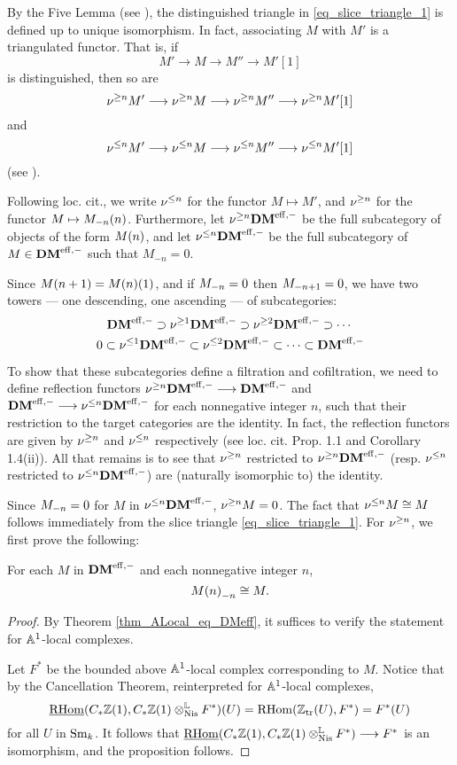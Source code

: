 By the Five Lemma (see \cite[10.2.2]{WH}), the distinguished 
triangle in \eqref{eq_slice_triangle_1} is defined up to unique 
isomorphism. In fact, associating $M$ with $M'$ is a triangulated 
functor. That is, if
\[
M' \to M \to M'' \to M'[1]
\]
is distinguished, then so are
\[
\sgDM{n}M' \to \sgDM{n}M \to \sgDM{n}M'' \to \sgDM{n}M'[1]
\]
and
\[
\slDM{n}M' \to \slDM{n}M \to \slDM{n}M'' \to \slDM{n}M'[1]
\]
(see \cite[Corollary 1.4]{HuKa}).

Following loc. cit., we write $\slDM{n}$ for the functor $M 
\mapsto M'$, and $\sgDM{n}$ for the functor $M \mapsto 
\tZ[n]{\hZ[n]{M}}$. Furthermore, let $\sgDM{n}\DMeff$ be the full
subcategory of objects of the form $\tZ[n]{M}$, and let 
$\slDM{n} \DMeff$ be the full subcategory of $M \in \DMeff$ such 
that $M_{-n} = 0$.

Since $\tZ[n + 1]{M} = \tZ[1]{\tZ[n]{M}}$, and if $\hZ[n]{M} = 0$
then $\hZ[n + 1]{M} = 0$, we have two towers --- one descending, one 
ascending --- of subcategories:
\begin{equation}
\DMeff \supset \sgDM{1}\DMeff \supset \sgDM{2}\DMeff \supset \cdots \\
\end{equation}
\vskip 5pt
\begin{equation}
0 \subset \slDM{1}\DMeff \subset \slDM{2}\DMeff \subset \cdots \subset
\DMeff
\end{equation}

To show that these subcategories define a filtration and 
cofiltration, we need to define reflection functors 
$\sgDM{n}\DMeff \to \DMeff$ and $\DMeff \to \slDM{n}\DMeff$ for 
each nonnegative integer $n$, such that their restriction to the 
target categories are the identity. In fact, the reflection 
functors are given by $\sgDM{n}$ and $\slDM{n}$ respectively (see 
loc. cit. Prop. 1.1 and Corollary 1.4(ii)). All that remains is 
to see that $\sgDM{n}$ restricted to $\sgDM{n}\DMeff$ (resp. 
$\slDM{n}$ restricted to $\slDM{n}\DMeff$) are (naturally 
isomorphic to) the identity.

Since $\hZ[n]{M} = 0$ for $M$ in $\slDM{n}\DMeff$, $\sgDM{n} M = 
0$. The fact that $\slDM{n} M \cong M$ follows immediately from 
the slice triangle \eqref{eq_slice_triangle_1}. For $\sgDM{n}$, we 
first prove the following:

\begin{prop}
For each $M$ in $\DMeff$ and each nonnegative integer $n$, 
\[
\hZ[n]{\tZ[n]{M}} \cong M.
\]
\end{prop}
\begin{proof}
By Theorem \ref{thm_ALocal_eq_DMeff}, it suffices to verify the
statement for $\A^1$-local complexes. 

Let $F^*$ be the bounded above $\A^1$-local complex corresponding 
to $M$. Notice that by the Cancellation Theorem, reinterpreted for
$\A^1$-local complexes,
\[
\sheaf{\rhom}(\suslC \Z(1), \suslC \Z(1) \tLNis F^*)(U) = 
\rhom(\Ztr(U), F^*) = F^*(U)
\]
for all $U$ in $\Sm$. It follows that $\sheaf{\rhom}(\suslC\Z(1),
\suslC\Z(1) \tLNis F^*) \to F^*$ is an isomorphism, and the
proposition follows.
\end{proof}

